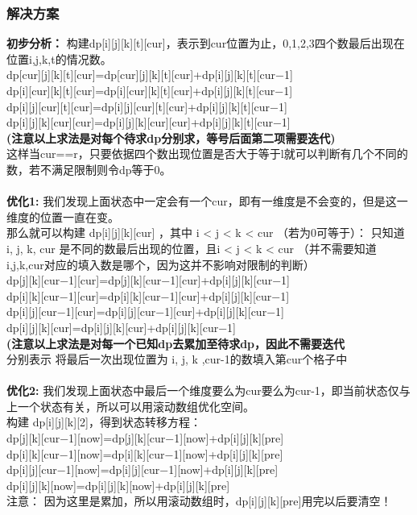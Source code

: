     \subsubsection{解决方案}
        \textbf{初步分析：}
        构建dp[i][j][k][t][cur]，表示到cur位置为止，0,1,2,3四个数最后出现在位置i,j,k,t的情况数。\\
        dp[cur][j][k][t][cur]=dp[cur][j][k][t][cur]+dp[i][j][k][t][cur−1]\\
        dp[i][cur][k][t][cur]=dp[i][cur][k][t][cur]+dp[i][j][k][t][cur−1]\\
        dp[i][j][cur][t][cur]=dp[i][j][cur][t][cur]+dp[i][j][k][t][cur−1]\\
        dp[i][j][k][cur][cur]=dp[i][j][k][cur][cur]+dp[i][j][k][t][cur−1]\\
        \textbf{(注意以上求法是对每个待求dp分别求，等号后面第二项需要迭代)}\\
        这样当cur==r，只要依据四个数出现位置是否大于等于l就可以判断有几个不同的数，若不满足限制则令dp等于0。\\\\
        \textbf{优化1:}
        我们发现上面状态中一定会有一个cur，即有一维度是不会变的，但是这一维度的位置一直在变。\\
        那么就可以构建 dp[i][j][k][cur] ，其中 i < j < k < cur （若为0可等于）： 
        只知道 i, j, k, cur 是不同的数最后出现的位置，且i < j < k < cur （并不需要知道 i,j,k,cur对应的填入数是哪个，因为这并不影响对限制的判断）\\
        dp[j][k][cur−1][cur]=dp[j][k][cur−1][cur]+dp[i][j][k][cur−1]\\
        dp[i][k][cur−1][cur]=dp[i][k][cur−1][cur]+dp[i][j][k][cur−1]\\
        dp[i][j][cur−1][cur]=dp[i][j][cur−1][cur]+dp[i][j][k][cur−1]\\
        dp[i][j][k][cur]=dp[i][j][k][cur]+dp[i][j][k][cur−1]\\
        \textbf{(注意以上求法是对每一个已知dp去累加至待求dp，因此不需要迭代}\\
        分别表示 将最后一次出现位置为 i, j, k ,cur-1的数填入第cur个格子中\\\\
        \textbf{优化2:}
        我们发现上面状态中最后一个维度要么为cur要么为cur-1，即当前状态仅与上一个状态有关，所以可以用滚动数组优化空间。\\
        构建 dp[i][j][k][2]，得到状态转移方程：\\
        dp[j][k][cur−1][now]=dp[j][k][cur−1][now]+dp[i][j][k][pre]\\
        dp[i][k][cur−1][now]=dp[i][k][cur−1][now]+dp[i][j][k][pre]\\
        dp[i][j][cur−1][now]=dp[i][j][cur−1][now]+dp[i][j][k][pre]\\
        dp[i][j][k][now]=dp[i][j][k][now]+dp[i][j][k][pre]\\
        注意： 因为这里是累加，所以用滚动数组时，dp[i][j][k][pre]用完以后要清空！

